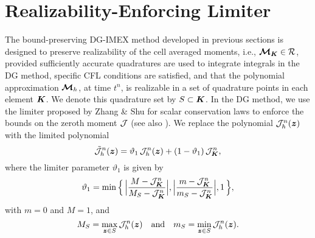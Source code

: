 \section{Realizability-Enforcing Limiter}
\label{sec:limiter}

The bound-preserving DG-IMEX method developed in previous sections is designed to preserve realizability of the cell averaged moments, i.e., $\boldsymbol{\mathcal{M}}_{\boldsymbol{K}}\in\mathcal{R}$, provided sufficiently accurate quadratures are used to integrate integrals in the DG method, specific CFL conditions are satisfied, and that the polynomial approximation $\boldsymbol{\mathcal{M}}_{h}$, at time $t^{n}$, is realizable in a set of quadrature points in each element $\boldsymbol{K}$.  
We denote this quadrature set by $S\subset\boldsymbol{K}$.  
In the DG method, we use the limiter proposed by Zhang \& Shu \cite{zhangShu_2010a} for scalar conservation laws to enforce the bounds on the zeroth moment $\mathcal{J}$ (see also \cite{liuOsher_1996}).  
We replace the polynomial $\mathcal{J}_{h}^{n}(\boldsymbol{z})$ with the limited polynomial
\begin{equation}
  \tilde{\mathcal{J}}_{h}^{n}(\boldsymbol{z})
  =\vartheta_{1}\,\mathcal{J}_{h}^{n}(\boldsymbol{z})+(1-\vartheta_{1})\,\mathcal{J}_{\boldsymbol{K}}^{n},
  \label{eq:limitDensity}
\end{equation}
where the limiter parameter $\vartheta_{1}$ is given by
\begin{equation}
  \vartheta_{1}
  =\min\Big\{\,\Big|\frac{M-\mathcal{J}_{\boldsymbol{K}}^{n}}{M_{S}-\mathcal{J}_{\boldsymbol{K}}^{n}}\Big|,\Big|\frac{m-\mathcal{J}_{\boldsymbol{K}}^{n}}{m_{S}-\mathcal{J}_{\boldsymbol{K}}^{n}}\Big|,1\,\Big\},
\end{equation}
with $m=0$ and $M=1$, and
\begin{equation}
  M_{S}=\max_{\boldsymbol{z}\in S}\mathcal{J}_{h}^{n}(\boldsymbol{z})
  \quad\text{and}\quad
  m_{S}=\min_{\boldsymbol{z}\in S}\mathcal{J}_{h}^{n}(\boldsymbol{z}).  
\end{equation}

